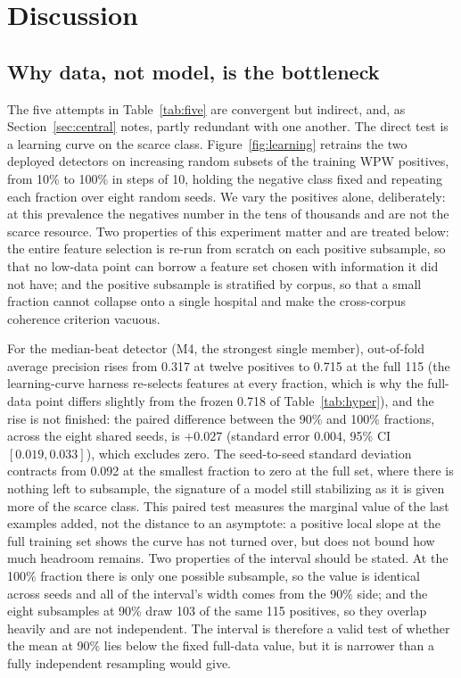 \documentclass[11pt]{article}
\begin{document}
\FloatBarrier
\section{Discussion}
\label{sec:discussion}

\subsection{Why data, not model, is the bottleneck}
\label{sec:bottleneck}

The five attempts in Table~\ref{tab:five} are convergent but indirect, and, as Section~\ref{sec:central} notes, partly redundant with one another. The direct test is a learning curve on the scarce class. Figure~\ref{fig:learning} retrains the two deployed detectors on increasing random subsets of the training WPW positives, from 10\% to 100\% in steps of 10, holding the negative class fixed and repeating each fraction over eight random seeds. We vary the positives alone, deliberately: at this prevalence the negatives number in the tens of thousands and are not the scarce resource. Two properties of this experiment matter and are treated below: the entire feature selection is re-run from scratch on each positive subsample, so that no low-data point can borrow a feature set chosen with information it did not have; and the positive subsample is stratified by corpus, so that a small fraction cannot collapse onto a single hospital and make the cross-corpus coherence criterion vacuous.

For the median-beat detector (M4, the strongest single member), out-of-fold average precision rises from 0.317 at twelve positives to 0.715 at the full 115 (the learning-curve harness re-selects features at every fraction, which is why the full-data point differs slightly from the frozen 0.718 of Table~\ref{tab:hyper}), and the rise is not finished: the paired difference between the 90\% and 100\% fractions, across the eight shared seeds, is $+0.027$ (standard error 0.004, 95\% CI $[0.019, 0.033]$), which excludes zero. The seed-to-seed standard deviation contracts from 0.092 at the smallest fraction to zero at the full set, where there is nothing left to subsample, the signature of a model still stabilizing as it is given more of the scarce class. This paired test measures the marginal value of the last examples added, not the distance to an asymptote: a positive local slope at the full training set shows the curve has not turned over, but does not bound how much headroom remains. Two properties of the interval should be stated. At the 100\% fraction there is only one possible subsample, so the value is identical across seeds and all of the interval's width comes from the 90\% side; and the eight subsamples at 90\% draw 103 of the same 115 positives, so they overlap heavily and are not independent. The interval is therefore a valid test of whether the mean at 90\% lies below the fixed full-data value, but it is narrower than a fully independent resampling would give.
\end{document}
